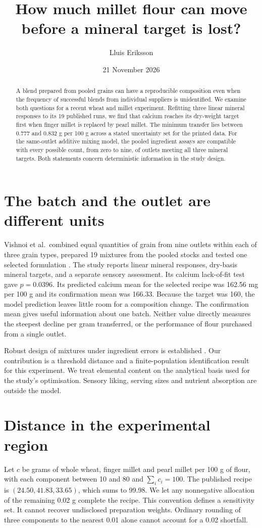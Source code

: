\documentclass[11pt]{article}
\title{How much millet flour can move before a mineral target is lost?}
\author{Lluis Eriksson}
\date{21 November 2026}
\begin{document}
\maketitle
\begin{abstract}
A blend prepared from pooled grains can have a reproducible composition even when the frequency of successful blends from individual suppliers is unidentified. We examine both questions for a recent wheat and millet experiment. Refitting three linear mineral responses to its 19 published runs, we find that calcium reaches its dry-weight target first when finger millet is replaced by pearl millet. The minimum transfer lies between 0.777 and 0.832 g per 100 g across a stated uncertainty set for the printed data. For the same-outlet additive mixing model, the pooled ingredient assays are compatible with every possible count, from zero to nine, of outlets meeting all three mineral targets. Both statements concern deterministic information in the study design.
\end{abstract}

\section{The batch and the outlet are different units}
Vishnoi et al.\ combined equal quantities of grain from nine outlets within each of three grain types, prepared 19 mixtures from the pooled stocks and tested one selected formulation \cite{primary}. The study reports linear mineral responses, dry-basis mineral targets, and a separate sensory assessment. Its calcium lack-of-fit test gave $p=0.0396$. Its predicted calcium mean for the selected recipe was 162.56 mg per 100 g and its confirmation mean was 166.33. Because the target was 160, the model prediction leaves little room for a composition change. The confirmation mean gives useful information about one batch. Neither value directly measures the steepest decline per gram transferred, or the performance of flour purchased from a single outlet.

Robust design of mixtures under ingredient errors is established \cite{steiner,sahni}. Our contribution is a threshold distance and a finite-population identification result for this experiment. We treat elemental content on the analytical basis used for the study's optimisation. Sensory liking, serving sizes and nutrient absorption are outside the model.

\section{Distance in the experimental region}
Let $c$ be grams of whole wheat, finger millet and pearl millet per 100 g of flour, with each component between 10 and 80 and $\sum_i c_i=100$. The published recipe is $(24.50,41.83,33.65)$, which sums to 99.98. We let any nonnegative allocation of the remaining 0.02 g complete the recipe. This convention defines a sensitivity set. It cannot recover undisclosed preparation weights. Ordinary rounding of three components to the nearest 0.01 alone cannot account for a 0.02 shortfall.
\end{document}
